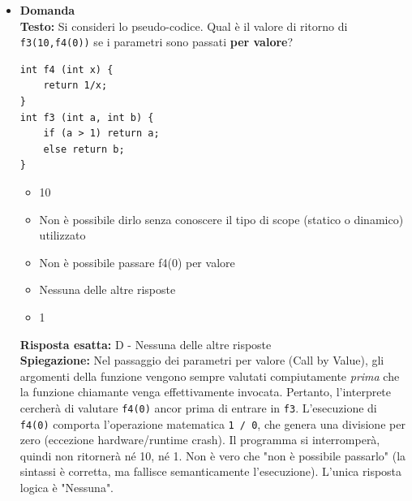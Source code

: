 \documentclass[12pt, a4paper]{article}
\newcounter{domandateoria}
\begin{document}
\begin{itemize}
\item {}\textbf{Domanda \thedomandateoria} \\
    \textbf{Testo:} Si consideri lo pseudo-codice. Qual è il valore di ritorno di \texttt{f3(10,f4(0))} se i parametri sono passati \textbf{per valore}?
\begin{verbatim}
int f4 (int x) {
    return 1/x;
}
int f3 (int a, int b) {
    if (a > 1) return a;
    else return b;
}
\end{verbatim}
    \begin{itemize}
        \item[A)] 10
        \item[B)] Non è possibile dirlo senza conoscere il tipo di scope (statico o dinamico) utilizzato
        \item[C)] Non è possibile passare f4(0) per valore
        \item[D)] Nessuna delle altre risposte
        \item[E)] 1
    \end{itemize}
    \textbf{Risposta esatta:} D - Nessuna delle altre risposte \\
    \textbf{Spiegazione:} Nel passaggio dei parametri per valore (Call by Value), gli argomenti della funzione vengono sempre valutati compiutamente \textit{prima} che la funzione chiamante venga effettivamente invocata. Pertanto, l'interprete cercherà di valutare \texttt{f4(0)} ancor prima di entrare in \texttt{f3}. L'esecuzione di \texttt{f4(0)} comporta l'operazione matematica \texttt{1 / 0}, che genera una divisione per zero (eccezione hardware/runtime crash). Il programma si interromperà, quindi non ritornerà né 10, né 1. Non è vero che "non è possibile passarlo" (la sintassi è corretta, ma fallisce semanticamente l'esecuzione). L'unica risposta logica è "Nessuna".
    \vspace{0.3cm}


\end{itemize}
\end{document}
